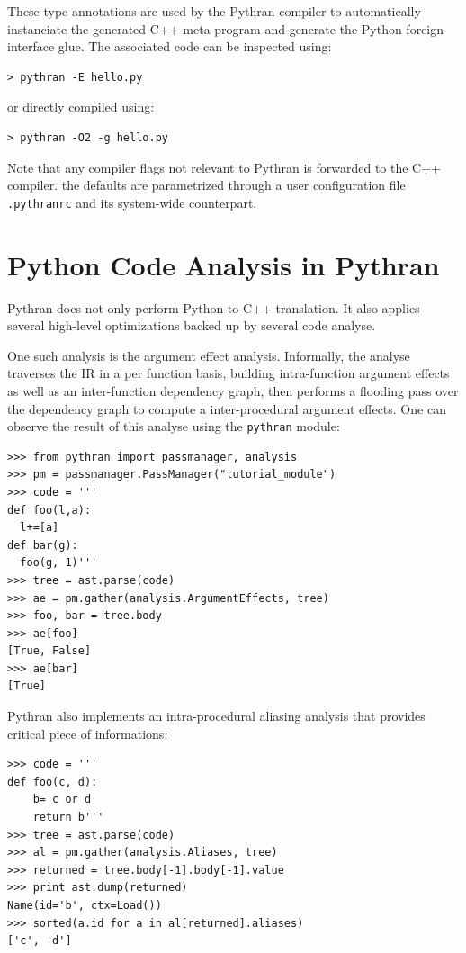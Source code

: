 \documentclass{llncs}
\begin{document}
These type annotations are used by the Pythran compiler to automatically
instanciate the generated C++ meta program and generate the Python foreign
interface glue. The associated code can be inspected using:

\begin{lstlisting}
> pythran -E hello.py
\end{lstlisting}

\noindent or directly compiled using:

\begin{lstlisting}
> pythran -O2 -g hello.py
\end{lstlisting}

Note that any compiler flags not relevant to Pythran is forwarded to the C++
compiler. the defaults are parametrized through a user configuration file
\texttt{.pythranrc} and its system-wide counterpart.

\section{Python Code Analysis in Pythran}
\label{sec:code-analyse}

Pythran does not only perform Python-to-C++ translation. It also applies
several high-level optimizations backed up by several code analyse.

One such analysis is the argument effect analysis. Informally, the analyse
traverses the \ac{IR} in a per function basis, building intra-function
argument effects as well as an inter-function dependency graph, then performs a
flooding pass over the dependency graph to compute a inter-procedural argument
effects. One can observe the result of this analyse using the \texttt{pythran} module:

\begin{lstlisting}
>>> from pythran import passmanager, analysis
>>> pm = passmanager.PassManager("tutorial_module")
>>> code = '''
def foo(l,a):
  l+=[a]
def bar(g):
  foo(g, 1)'''
>>> tree = ast.parse(code)
>>> ae = pm.gather(analysis.ArgumentEffects, tree)
>>> foo, bar = tree.body
>>> ae[foo]
[True, False]
>>> ae[bar]
[True]
\end{lstlisting}

Pythran also implements an intra-procedural aliasing analysis that provides
critical piece of informations:

\begin{lstlisting}
>>> code = '''
def foo(c, d):
    b= c or d
    return b'''
>>> tree = ast.parse(code)
>>> al = pm.gather(analysis.Aliases, tree)
>>> returned = tree.body[-1].body[-1].value
>>> print ast.dump(returned)
Name(id='b', ctx=Load())
>>> sorted(a.id for a in al[returned].aliases)
['c', 'd']
\end{lstlisting}
\end{document}
